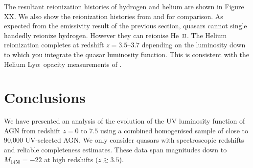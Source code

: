\documentclass[a4paper,fleqn,usenatbib]{mnras}
\def\lya{Ly$\alpha$~}
\def\HeII{\hbox{He~$\scriptstyle\rm II$}}
\begin{document}
The resultant reionization histories of hydrogen and helium are shown
in Figure XX.  We also show the reionization histories from
\citep{2012ApJ...746..125H} and \citep{2015ApJ...813L...8M} for
comparison.  As expected from the emissivity result of the previous
section, quasars cannot single handedly reionize hydrogen.  However
they can reionise \HeII.  The Helium reionization completes at
redshift $z=3.5$--$3.7$ depending on the luminosity down to which you
integrate the quasar luminosity function.  This is consistent with the
Helium \lya opacity measurements of \citet{2016ApJ...825..144W}.

\section{Conclusions}

We have presented an analysis of the evolution of the UV luminosity
function of AGN from redshift $z=0$ to $7.5$ using a combined
homogenised sample of close to 90,000 UV-selected AGN.  We only
consider quasars with spectroscopic redshifts and reliable
completeness estimates.  These data span magnitudes down to
$M_{1450}=-22$ at high redshifts ($z\gtrsim 3.5$).
\end{document}
